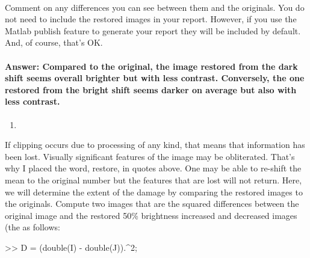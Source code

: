 \documentclass[11pt]{article}
\newenvironment{Shaded}{}{}
\newcommand{\FloatTok}[1]{\textcolor[rgb]{0.25,0.63,0.44}{{#1}}}
\newcommand{\NormalTok}[1]{{#1}}
\begin{document}
    \begin{center}
    \end{center}
    { \hspace*{\fill} \\}
    
    Comment on any differences you can see between them and the originals.
You do not need to include the restored images in your report. However,
if you use the Matlab publish feature to generate your report they will
be included by default. And, of course, that's OK.

\hypertarget{answer-compared-to-the-original-the-image-restored-from-the-dark-shift-seems-overall-brighter-but-with-less-contrast.-conversely-the-one-restored-from-the-bright-shift-seems-darker-on-average-but-also-with-less-contrast.}{%
\paragraph{Answer: Compared to the original, the image restored from the
dark shift seems overall brighter but with less contrast. Conversely,
the one restored from the bright shift seems darker on average but also
with less
contrast.}\label{answer-compared-to-the-original-the-image-restored-from-the-dark-shift-seems-overall-brighter-but-with-less-contrast.-conversely-the-one-restored-from-the-bright-shift-seems-darker-on-average-but-also-with-less-contrast.}}

    \begin{enumerate}
\def\labelenumi{\arabic{enumi}.}
\setcounter{enumi}{8}
\item
\end{enumerate}

If clipping occurs due to processing of any kind, that means that
information has been lost. Visually significant features of the image
may be obliterated. That's why I placed the word, restore, in quotes
above. One may be able to re-shift the mean to the original number but
the features that are lost will not return. Here, we will determine the
extent of the damage by comparing the restored images to the originals.
Compute two images that are the squared differences between the original
image and the restored 50\% brightness increased and decreased images
(the as follows:

\begin{Shaded}
\begin{Highlighting}[]
\NormalTok{>> D = (double(I) - double(J)).^}\FloatTok{2}\NormalTok{;}
\end{Highlighting}
\end{Shaded}
\end{document}

